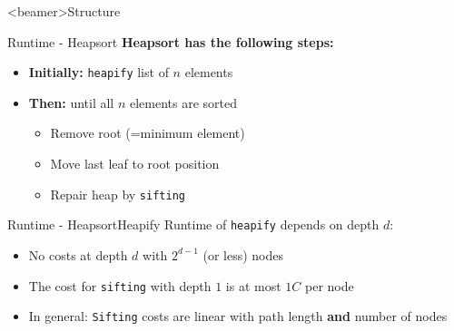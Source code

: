 \setcounter{subsubsection}{0}

\begin{frame}<beamer>{Structure}
\end{frame}


\begin{frame}{Runtime - Heapsort}
  \textbf{Heapsort has the following steps:}
  \begin{itemize}
    \item
      \textbf{Initially:} \texttt{heapify} list of $n$ elements
    \item<2- |handout:1>
    \textbf{Then:} until all $n$ elements are sorted
    \begin{itemize}
      \item<3- |handout:1>
        Remove root (=minimum element)
      \item<4- |handout:1>
        Move last leaf to root position
      \item<5- |handout:1>
        Repair heap by \texttt{sifting}
    \end{itemize}
  \end{itemize}
\end{frame}


\begin{frame}{Runtime - Heapsort}{Heapify}
  Runtime of \texttt{heapify} depends on depth {\color{MainA}$d$}:
  \begin{figure}[!h]
    \begin{adjustbox}{width=0.7\linewidth}
      
    \end{adjustbox}
    \vspace{-0.5em}
  \end{figure}
  \begin{itemize}
    \item<2- |handout:1>
      No costs at depth {\color{MainA}$d$} with {\color{MainA}$2^{d-1}$}
      (or less) nodes
    \item<3- |handout:1>
      The cost for \texttt{sifting} with depth {\color{MainA}$1$}
      is at most {\color{MainA}$1 C$} per node
    \item<4- |handout:1>
      In general: \texttt{Sifting} costs are linear with path length
      \textbf{and} number of nodes
  \end{itemize}
\end{frame}

